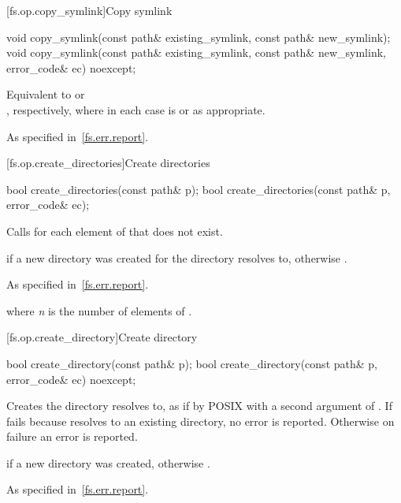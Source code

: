 [fs.op.copy_symlink]{Copy symlink}

%
\begin{itemdecl}
void copy_symlink(const path& existing_symlink, const path& new_symlink);
void copy_symlink(const path& existing_symlink, const path& new_symlink,
                  error_code& ec) noexcept;
\end{itemdecl}

\begin{itemdescr}
\pnum
\effects Equivalent to
 or\\
, respectively,
  where in each case  is  or
   as appropriate.

\pnum
\throws As specified in~\ref{fs.err.report}.
\end{itemdescr}


[fs.op.create_directories]{Create directories}

%
\begin{itemdecl}
bool create_directories(const path& p);
bool create_directories(const path& p, error_code& ec);
\end{itemdecl}

\begin{itemdescr}
\pnum
\effects Calls  for each element of 
  that does not exist.

\pnum
\returns {} if a new directory was created
  for the directory  resolves to,
  otherwise .

\pnum
\throws As specified in~\ref{fs.err.report}.

\pnum
\complexity {} where \textit{n} is the number of elements
  of .
\end{itemdescr}


[fs.op.create_directory]{Create directory}

%
\begin{itemdecl}
bool create_directory(const path& p);
bool create_directory(const path& p, error_code& ec) noexcept;
\end{itemdecl}

\begin{itemdescr}
\pnum
\effects Creates the directory  resolves to,
  as if by POSIX  with a second argument of
  .
  If  fails because  resolves to an existing directory,
  no error is reported. Otherwise on failure an error is reported.

\pnum
\returns {} if a new directory was created, otherwise .

\pnum
\throws As specified in~\ref{fs.err.report}.
\end{itemdescr}

